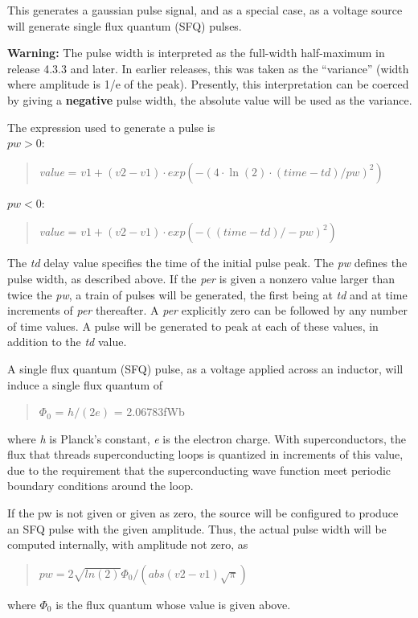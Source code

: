 This generates a gaussian pulse signal, and as a special case, as a
voltage source will generate single flux quantum (SFQ) pulses.

{\bf Warning:} The pulse width is interpreted as the full-width
half-maximum in release 4.3.3 and later.  In earlier releases, this
was taken as the ``variance'' (width where amplitude is 1/e of the
peak).  Presently, this interpretation can be coerced by giving a {\bf
negative} pulse width, the absolute value will be used as the
variance.

The expression used to generate a pulse is\\
$pw > 0$:\\
\begin{quote}
{\it value} = $v1 + (v2 - v1){\cdot}exp(-(4\cdot\ln(2)\cdot(time-td)/pw)^2)$
\end{quote}
$pw < 0$:\\
\begin{quote}
{\it value} = $v1 + (v2 - v1){\cdot}exp(-((time-td)/-pw)^2)$
\end{quote}

The {\it td} delay value specifies the time of the initial pulse peak. 
The {\it pw} defines the pulse width, as described above.  If the {\it
per} is given a nonzero value larger than twice the {\it pw}, a train
of pulses will be generated, the first being at {\it td} and at time
increments of {\it per} thereafter.  A {\it per} explicitly zero can
be followed by any number of time values.  A pulse will be generated
to peak at each of these values, in addition to the {\it td} value.

A single flux quantum (SFQ) pulse, as a voltage applied across an
inductor, will induce a single flux quantum of
\begin{quote}
 $\Phi_0$ = $h/(2e)$ = 2.06783fWb
\end{quote}
where {\it h} is Planck's constant, {\it e} is the electron charge. 
With superconductors, the flux that threads superconducting loops is
quantized in increments of this value, due to the requirement that the
superconducting wave function meet periodic boundary conditions around
the loop.

If the {\vt pw} is not given or given as zero, the source will be
configured to produce an SFQ pulse with the given amplitude.  Thus,
the actual pulse width will be computed internally, with amplitude not
zero, as
\begin{quote}
$pw = 2\sqrt{ln(2)}\Phi_0/(abs(v2-v1)\sqrt\pi)$
\end{quote}
where $\Phi_0$ is the flux quantum whose value is given above.

